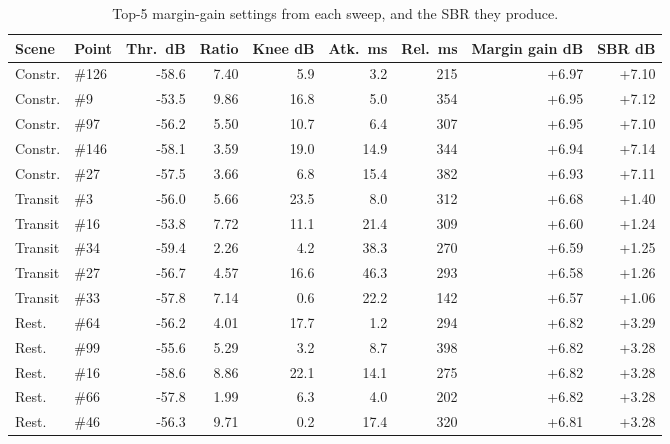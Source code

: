 \documentclass[11pt]{article}
\begin{document}
\begin{table}[H]\centering\scriptsize
\caption{Top-5 margin-gain settings from each sweep, and the SBR they produce.}
\begin{tabular}{@{}llrrrrrrr@{}}\toprule
Scene & Point & Thr.\ dB & Ratio & Knee dB & Atk.\ ms & Rel.\ ms & Margin gain dB & SBR dB \\\midrule
Constr. & \#126 & -58.6 & 7.40 & 5.9 & 3.2 & 215 & +6.97 & +7.10 \\
Constr. & \#9 & -53.5 & 9.86 & 16.8 & 5.0 & 354 & +6.95 & +7.12 \\
Constr. & \#97 & -56.2 & 5.50 & 10.7 & 6.4 & 307 & +6.95 & +7.10 \\
Constr. & \#146 & -58.1 & 3.59 & 19.0 & 14.9 & 344 & +6.94 & +7.14 \\
Constr. & \#27 & -57.5 & 3.66 & 6.8 & 15.4 & 382 & +6.93 & +7.11 \\
\midrule
Transit & \#3 & -56.0 & 5.66 & 23.5 & 8.0 & 312 & +6.68 & +1.40 \\
Transit & \#16 & -53.8 & 7.72 & 11.1 & 21.4 & 309 & +6.60 & +1.24 \\
Transit & \#34 & -59.4 & 2.26 & 4.2 & 38.3 & 270 & +6.59 & +1.25 \\
Transit & \#27 & -56.7 & 4.57 & 16.6 & 46.3 & 293 & +6.58 & +1.26 \\
Transit & \#33 & -57.8 & 7.14 & 0.6 & 22.2 & 142 & +6.57 & +1.06 \\
\midrule
Rest. & \#64 & -56.2 & 4.01 & 17.7 & 1.2 & 294 & +6.82 & +3.29 \\
Rest. & \#99 & -55.6 & 5.29 & 3.2 & 8.7 & 398 & +6.82 & +3.28 \\
Rest. & \#16 & -58.6 & 8.86 & 22.1 & 14.1 & 275 & +6.82 & +3.28 \\
Rest. & \#66 & -57.8 & 1.99 & 6.3 & 4.0 & 202 & +6.82 & +3.28 \\
Rest. & \#46 & -56.3 & 9.71 & 0.2 & 17.4 & 320 & +6.81 & +3.28 \\
\bottomrule
\end{tabular}\end{table}
\end{document}
